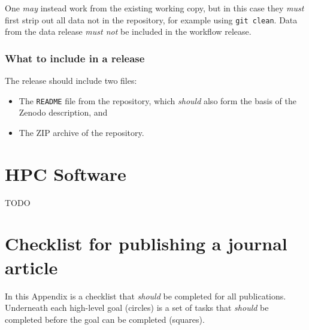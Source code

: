 \documentclass{article}
\newcommand\rfcword[1]{\emph{#1}\xspace}
\newcommand\must{\rfcword{must}}
\newcommand\mustnot{\rfcword{must not}}
\newcommand\should{\rfcword{should}}
\newcommand\may{\rfcword{may}}
\newcommand\filename[1]{\texttt{#1}\xspace}
\newcommand\readme{\filename{README}\xspace}
\begin{document}
One \may instead work from the existing working copy,
but in this case they \must first strip out all data not in the repository,
for example using \verb|git clean|.
Data from the data release \mustnot be included in the workflow release.

\subsubsection{What to include in a release}

The release should include two files:

\begin{itemize}
  \item
        The \readme file from the repository,
        which \should also form the basis of the Zenodo description, and
  \item
        The ZIP archive of the repository.
\end{itemize}



\section{HPC Software}
TODO





\clearpage
\appendix

\section{Checklist for publishing a journal article}

In this Appendix is a checklist that \should be completed for all publications.
Underneath each high-level goal
(circles)
is a set of tasks that \should be completed before the goal can be completed
(squares).
\end{document}
